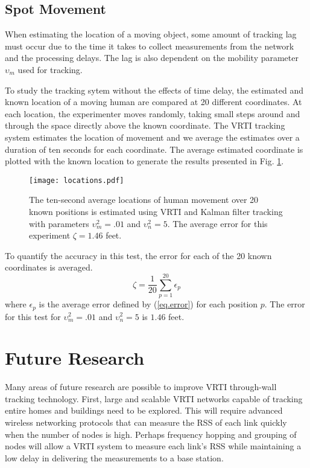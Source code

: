 \documentclass[journal]{IEEEtran}
\begin{document}
\subsection{Spot Movement}
When estimating the location of a moving object, some amount of tracking lag must occur due to the time it takes to collect measurements from the network and the processing delays.  The lag is also dependent on the mobility parameter $\upsilon_m$ used for tracking.

To study the tracking sytem without the effects of time delay, the estimated and known location of a moving human are compared at 20 different coordinates. At each location, the experimenter moves randomly, taking small steps around and through the space directly above the known coordinate. The VRTI tracking system estimates the location of movement and we average the estimates over a duration of ten seconds for each coordinate. The average estimated coordinate is plotted with the known location to generate the results presented in Fig. \ref{fig.locations}.

\begin{figure}
\centering
\texttt{[image: locations.pdf]}
\caption{The ten-second average locations of human movement over 20 known positions is estimated using VRTI and Kalman filter tracking with parameters $\upsilon^2_m=.01$ and $\upsilon^2_n = 5$. The average error for this experiment $\zeta = 1.46$ feet. }
\label{fig.locations}
\end{figure}

To quantify the accuracy in this test, the error for each of the 20 known coordinates is averaged.
\begin{equation}
\zeta = \frac{1}{20} \sum_{p=1}^{20} \epsilon_p
\end{equation}
where $\epsilon_p$ is the average error defined by (\ref{eq.error}) for each position $p$. The error for this test for $\upsilon^2_m=.01$ and $\upsilon^2_n = 5$ is $1.46$ feet.

\section{Future Research}\label{section.futureResearch}

Many areas of future research are possible to improve VRTI through-wall tracking technology. First, large and scalable VRTI networks capable of tracking entire homes and buildings need to be explored. This will require advanced wireless networking protocols that can measure the RSS of each link quickly when the number of nodes is high. Perhaps frequency hopping and grouping of nodes will allow a VRTI system to measure each link's RSS while maintaining a low delay in delivering the measurements to a base station.
\end{document}
